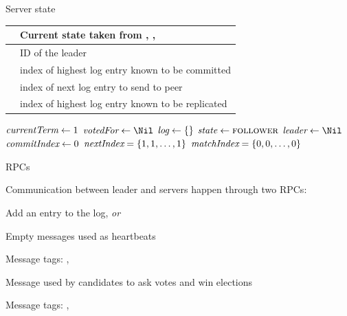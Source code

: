 \begin{frame}{Server state}


\medskip
\begin{tabular}{| P{2.2cm} | P{8.8cm} | }
\hline
\RED{$\State$}	& Current state taken from \Leader, \Candidate, \Follower \\\hline
\RED{$\LeaderVar$} & ID of the leader \\\hline
\RED{$\commitIndex$} & index of highest log entry known to be committed \\\hline
\RED{$\nextIndex[\,]$} & index of next log entry to send to peer \\\hline
\RED{$\matchIndex[\,]$} & index of highest log entry known to be replicated \\\hline
\end{tabular}

\medskip
{}
{
\vspace{-6pt}
\setlength{\interspacetitleruled}{0pt}%
\setlength{\algotitleheightrule}{0pt}%
\begin{Procedure}
\begin{multicols}{2}
$\textit{currentTerm} \gets 1$\;
$\VotedFor \gets \Nil$\;
$\textit{log} \gets \{ \}$\;
$\textit{state} \gets \textsc{follower}$\;
$\LeaderVar \gets \Nil$\;
$\textit{commitIndex} \gets 0$\;
$\textit{nextIndex} = \{ 1, 1, \ldots, 1 \}$\;
$\textit{matchIndex} = \{ 0, 0, \ldots, 0 \}$\;
\end{multicols}
\end{Procedure}
}


\end{frame}



\begin{frame}{RPCs}

Communication between leader and servers happen through two RPCs:
\BIL
\item \AppendRPC
	\BI
	\item Add an entry to the log, \emph{or}
	\item Empty messages used as \alert{heartbeats}
	\item Message tags: \APPENDREQUEST, \APPENDREPLY
	\EI 
\item \VoteRPC
	\BI
	\item Message used by candidates to ask votes and win elections
	\item Message tags: \VOTEREQUEST, \VOTEREPLY
	\EI
\EIL

\end{frame}

